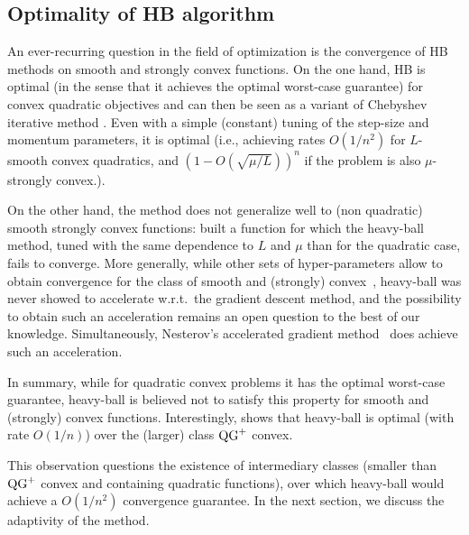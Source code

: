 
\subsection{Optimality of HB algorithm}

An ever-recurring question in the field of optimization is the convergence of HB methods on smooth and strongly convex functions. On the one hand, HB is optimal (in the sense that it achieves the optimal worst-case guarantee) for convex quadratic objectives and can then be seen as a variant of Chebyshev iterative method \citep{flanders1950numerical,lanczos1952solution, young1953richardson}. Even with a simple (constant) tuning of the step-size and momentum parameters, it is optimal (i.e., achieving rates $O(1/n^2)$ for $L$-smooth convex quadratics, and $(1-O(\sqrt{\mu/L}))^n$ if the problem is also $\mu$-strongly convex.).

On the other hand, the  method does not generalize well to (non quadratic) smooth strongly convex functions: \citet[Figure 7]{lessard2016analysis} built a function for which the heavy-ball method, tuned with the same dependence to $L$ and $\mu$ than for the quadratic case, fails to converge.
More generally, while other sets of hyper-parameters allow to obtain convergence for the class of smooth and (strongly) convex~\citep{ghadimi2014global}, heavy-ball was never showed to accelerate w.r.t.~the gradient descent method, and the possibility to obtain such an acceleration remains an open question to the best of our knowledge. Simultaneously, Nesterov's accelerated gradient method~\citep{nesterov1983method} does achieve such an acceleration.

In summary, while for quadratic convex problems it has the optimal worst-case guarantee, heavy-ball is believed not to satisfy this property for smooth and (strongly) convex functions.  Interestingly,  shows that heavy-ball is optimal (with rate $O(1/n)$) over the (larger) class $\operatorname{QG}^+$ convex.

This observation questions the existence of intermediary classes (smaller than $\operatorname{QG}^+$ convex and containing quadratic functions), over which heavy-ball would achieve a $O(1/n^2)$ convergence guarantee. In the next section, we discuss the adaptivity of the method.

